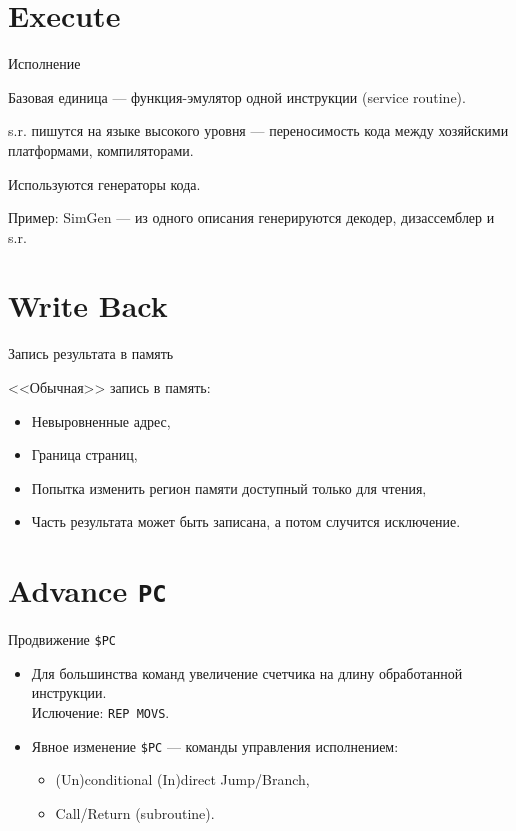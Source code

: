 \section{Execute}

\begin{frame}{Исполнение}

Базовая единица --- функция-эмулятор одной инструкции (service routine).

\bigskip

s.r. пишутся на языке высокого уровня --- переносимость кода между хозяйскими
платформами, компиляторами.

\bigskip

Используются генераторы кода.

Пример: SimGen --- из одного описания генерируются декодер, дизассемблер и s.r.

\end{frame}

\section{Write Back}

\begin{frame}{Запись результата в память}

<<Обычная>> запись в память:

\pause

\begin{itemize}
    \item Невыровненные адрес,
    \item Граница страниц,
    \item Попытка изменить регион памяти доступный только для чтения,
    \item Часть результата может быть записана, а потом случится исключение.
\end{itemize}

\end{frame}

\section{Advance \texttt{PC}}

\begin{frame}{Продвижение \texttt{\$PC}}

\begin{itemize}
    \item Для большинства команд увеличение счетчика на длину обработанной инструкции. \\
    Ислючение: \texttt{REP MOVS}.
    \pause\bigskip
    \item Явное изменение \texttt{\$PC} --- команды управления исполнением:
    \begin{itemize}
        \item (Un)conditional (In)direct Jump/Branch,
        \item Call/Return (subroutine).
    \end{itemize}
\end{itemize}

\end{frame}

